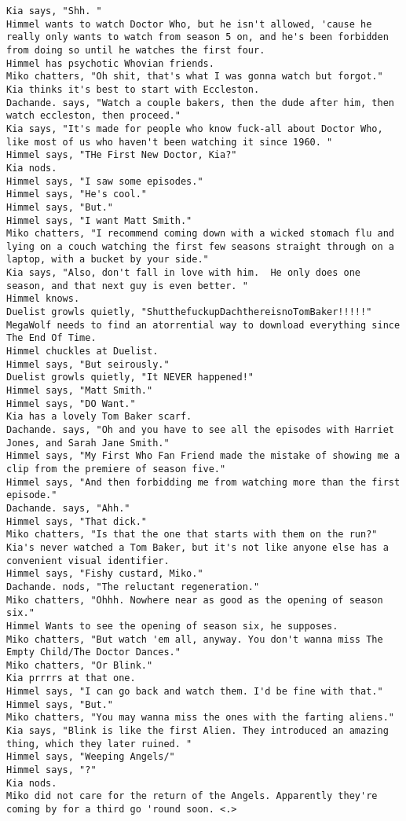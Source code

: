 \begin{verbatim}
Kia says, "Shh. "
Himmel wants to watch Doctor Who, but he isn't allowed, 'cause he really only wants to watch from season 5 on, and he's been forbidden from doing so until he watches the first four.
Himmel has psychotic Whovian friends.
Miko chatters, "Oh shit, that's what I was gonna watch but forgot."
Kia thinks it's best to start with Eccleston.
Dachande. says, "Watch a couple bakers, then the dude after him, then watch eccleston, then proceed."
Kia says, "It's made for people who know fuck-all about Doctor Who, like most of us who haven't been watching it since 1960. "
Himmel says, "THe First New Doctor, Kia?"
Kia nods.
Himmel says, "I saw some episodes."
Himmel says, "He's cool."
Himmel says, "But."
Himmel says, "I want Matt Smith."
Miko chatters, "I recommend coming down with a wicked stomach flu and lying on a couch watching the first few seasons straight through on a laptop, with a bucket by your side."
Kia says, "Also, don't fall in love with him.  He only does one season, and that next guy is even better. "
Himmel knows.
Duelist growls quietly, "ShutthefuckupDachthereisnoTomBaker!!!!!"
MegaWolf needs to find an atorrential way to download everything since The End Of Time.
Himmel chuckles at Duelist.
Himmel says, "But seirously."
Duelist growls quietly, "It NEVER happened!"
Himmel says, "Matt Smith."
Himmel says, "DO Want."
Kia has a lovely Tom Baker scarf.
Dachande. says, "Oh and you have to see all the episodes with Harriet Jones, and Sarah Jane Smith."
Himmel says, "My First Who Fan Friend made the mistake of showing me a clip from the premiere of season five."
Himmel says, "And then forbidding me from watching more than the first episode."
Dachande. says, "Ahh."
Himmel says, "That dick."
Miko chatters, "Is that the one that starts with them on the run?"
Kia's never watched a Tom Baker, but it's not like anyone else has a convenient visual identifier.
Himmel says, "Fishy custard, Miko."
Dachande. nods, "The reluctant regeneration."
Miko chatters, "Ohhh. Nowhere near as good as the opening of season six."
Himmel Wants to see the opening of season six, he supposes.
Miko chatters, "But watch 'em all, anyway. You don't wanna miss The Empty Child/The Doctor Dances."
Miko chatters, "Or Blink."
Kia prrrrs at that one.
Himmel says, "I can go back and watch them. I'd be fine with that."
Himmel says, "But."
Miko chatters, "You may wanna miss the ones with the farting aliens."
Kia says, "Blink is like the first Alien. They introduced an amazing thing, which they later ruined. "
Himmel says, "Weeping Angels/"
Himmel says, "?"
Kia nods.
Miko did not care for the return of the Angels. Apparently they're coming by for a third go 'round soon. <.>

\end{verbatim}
